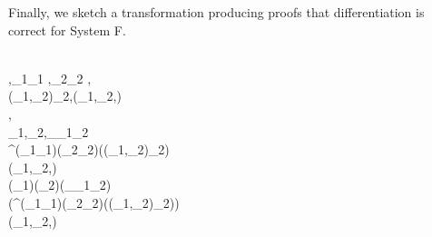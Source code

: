 Finally, we sketch a transformation producing proofs that differentiation is
correct for System F\@.
\begin{hscode}\SaveRestoreHook
{}%
%
%
%
%
%
\>[3]{}\mean{\EmptyContext}\mathrel{=}\EmptyContext{}\<[E]%
\\
\>[3]{}\mathrel{=}\mean{\Gamma},_{1}\typcolon{}_1 \mean{\tau},_{2}\typcolon{}_2 \mean{\tau},{}\<[E]%
\\
\>[3]{}\<[5]%
\>[5]{}\typcolon(_{1},_{2})\in \Delta_2\mean{\tau},\typcolon(_{1},_{2},)\in \Delta{}\mean{\tau}{}\<[E]%
\\
\>[3]{}\mean{\Gamma,\alpha\typcolon\star}\mathrel{=}\mean{\Gamma},{}\<[E]%
\\
\>[3]{}\<[5]%
\>[5]{}\alpha_{1}\typcolon\star,\alpha_{2}\typcolon\star,\Delta_\alpha\typcolon\alpha_{1}\to \alpha_{2}\to \star{}\<[E]%
\\
\>[3]{}\<[5]%
\>[5]{}^\alpha\typcolon\Pi (_{1}\typcolon\alpha_{1})\hsforall \;(_{2}\typcolon\alpha_{2})\;(\typcolon(_{1},_{2})\in \Delta_2\mean{\alpha})\to \lceil \star \rceil{}\<[E]%
\\[\blanklineskip]%
\>[3]{}(_{1},_{2},)\in \Delta{}\mathrel{=}{}\<[E]%
\\
\>[3]{}\<[5]%
\>[5]{}\Pi (\alpha_{1}\typcolon\star)\hsforall \;(\alpha_{2}\typcolon\star)\;(\Delta_\alpha\typcolon\alpha_{1}\to \alpha_{2}\to \star){}\<[E]%
\\
\>[3]{}\<[5]%
\>[5]{}(^\alpha\typcolon\Pi (_{1}\typcolon\alpha_{1})\hsforall \;(_{2}\typcolon\alpha_{2})\;(\typcolon(_{1},_{2})\in \Delta_2\mean{\alpha})\to \lceil \star \rceil)\<[E]%
\\
\>[5]{}\<[7]%
\>[7]{}(_{1},_{2},)\in \Delta{}\<[E]%

\end{hscode}
